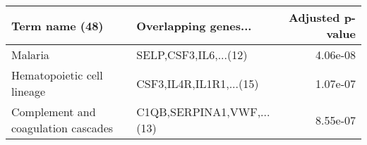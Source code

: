 \begin{tabular}{llr}
\toprule
                     Term name (48) &      Overlapping genes... &  Adjusted p-value \\
\midrule
                            Malaria &     SELP,CSF3,IL6,...(12) &          4.06e-08 \\
         Hematopoietic cell lineage &   CSF3,IL4R,IL1R1,...(15) &          1.07e-07 \\
Complement and coagulation cascades & C1QB,SERPINA1,VWF,...(13) &          8.55e-07 \\
\bottomrule
\end{tabular}
